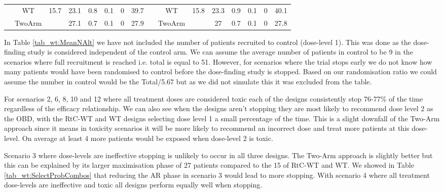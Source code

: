 \begin{table}
{\begin{tabular}[t]{ccccccc>{}c|cccccccc}
			& WT & 15.7 & 23.1 & 0.8 & 0.1 & 0 & 39.7 &  & WT & 15.8 & 23.3 & 0.9 & 0.1 & 0 & 40.1\\
			
			\multirow{-3}{*}{\centering\arraybackslash 6} & TwoArm &  & 27.1 & 0.7 & 0.1 & 0 & 27.9 & \multirow{-3}{*}{\centering\arraybackslash 12} & TwoArm &  & 27 & 0.7 & 0.1 & 0 & 27.8\\
			\bottomrule
	\end{tabular}}
\end{table}

 In Table \ref{tab_wt:MeanNAlt} we have not included the number of patients recruited to control (dose-level 1). This was done as the dose-finding study is considered independent of the control arm. We can assume the average number of patients in control to be 9 in the scenarios where full recruitment is reached i.e. total is equal to 51. However, for scenarios where the trial stops early we do not know how many patients would have been randomised to control before the dose-finding study is stopped. Based on our randomisation ratio we could assume the number in control would be the Total/5.67 but as we did not simulate this it was excluded from the table. 
 
 For scenarios 2, 6, 8, 10 and 12 where all treatment doses are considered toxic each of the designs consistently stop 76-77\% of the time regardless of the efficacy relationship. We can also see when the designs aren't stopping they are most likely to recommend dose level 2 as the OBD, with the RtC-WT and WT designs selecting dose level 1 a small percentage of the time. This is a slight downfall of the Two-Arm approach since it means in toxicity scenarios it will be more likely to recommend an incorrect dose and treat more patients at this dose-level. On average at least 4 more patients would be exposed when dose-level 2 is toxic. 
 
 Scenario 3 where dose-levels are ineffective stopping is unlikely to occur in all three designs. The Two-Arm approach is slightly better but this can be explained by its larger maximisation phase of 27 patients compared to the 15 of RtC-WT and WT. We showed in Table \ref{tab_wt:SelectProbCombos} that reducing the AR phase in scenario 3 would lead to more stopping. With scenario 4 where all treatment dose-levels are ineffective and toxic all designs perform equally well when stopping. 
 

